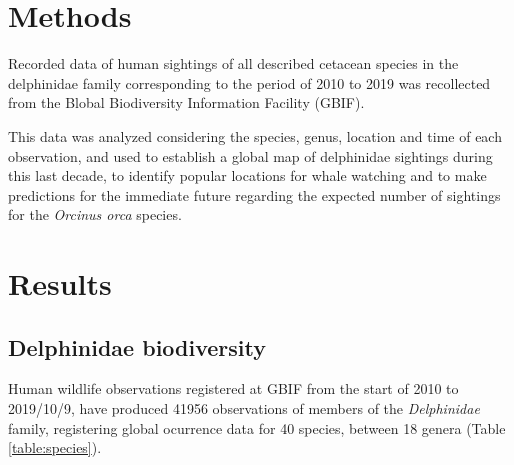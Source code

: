 \documentclass[10pt,letterpaper]{article}
\begin{document}
\hypertarget{methods}{%
\section{Methods}\label{methods}}

Recorded data of human sightings of all described cetacean species in
the delphinidae family corresponding to the period of 2010 to 2019 was
recollected from the Blobal Biodiversity Information Facility (GBIF).

This data was analyzed considering the species, genus, location and time
of each observation, and used to establish a global map of delphinidae
sightings during this last decade, to identify popular locations for
whale watching and to make predictions for the immediate future
regarding the expected number of sightings for the \emph{Orcinus orca}
species.

\hypertarget{results}{%
\section{Results}\label{results}}

\hypertarget{delphinidae-biodiversity}{%
\subsection{Delphinidae biodiversity}\label{delphinidae-biodiversity}}

\FloatBarrier

Human wildlife observations registered at GBIF from the start of 2010 to
2019/10/9, have produced 41956 observations of members of the
\emph{Delphinidae} family, registering global ocurrence data for 40
species, between 18 genera (Table \ref{table:species}).
\end{document}
